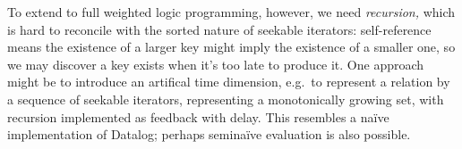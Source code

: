 \documentclass[acmsmall,screen,review,anonymous,dvipsnames,svgnames]{acmart}
\begin{document}
To extend to full weighted logic programming, however, we need \emph{recursion,} which is hard to reconcile with the sorted nature of seekable iterators: self-reference means the existence of a larger key might imply the existence of a smaller one, so we may discover a key exists when it's too late to produce it.
One approach might be to introduce an artifical time dimension, e.g.\ to represent a relation by a sequence of seekable iterators, representing a monotonically growing set, with recursion implemented as feedback with delay.
This resembles a na\"ive implementation of Datalog; perhaps semina\"ive evaluation is also possible.



\end{document}
